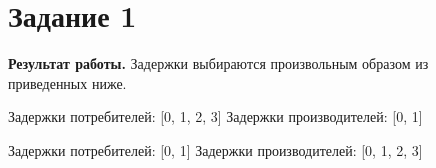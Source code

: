 
\section{Задание 1}

\textbf{Результат работы.}
Задержки выбираются произвольным образом из приведенных ниже.

Задержки потребителей: [0, 1, 2, 3]
Задержки производителей: [0, 1]

\begin{figure}[ht!]
\end{figure}


Задержки потребителей: [0, 1]
Задержки производителей: [0, 1, 2, 3] 

